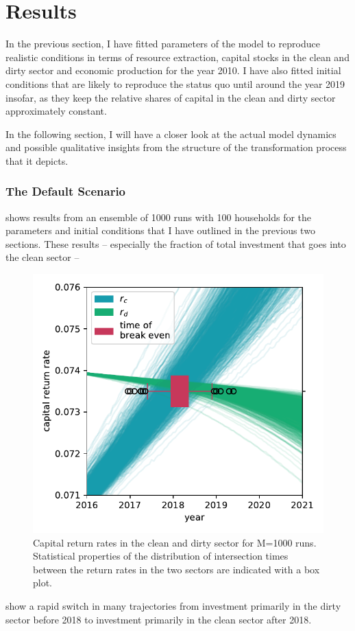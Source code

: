 \section{Results}  
In the previous section, I have fitted parameters of the model to reproduce realistic conditions in terms of resource extraction, capital stocks in the clean and dirty sector and economic production for the year 2010. I have also fitted initial conditions that are likely to reproduce the status quo until around the year 2019 insofar, as they keep the relative shares of capital in the clean and dirty sector approximately constant. 

In the following section, I will have a closer look at the actual model dynamics and possible qualitative insights from the structure of the transformation process that it depicts.

\subsubsection{The Default Scenario}
\label{sec:default_scenario}
 shows results from an ensemble of 1000 runs with 100 households for the parameters and initial conditions that I have outlined in the previous two sections. These results -- especially the fraction of total investment that goes into the clean sector -- 
\begin{figure}
	\vspace{-.1 cm}
        \hspace{-1.8 cm}
        \includegraphics[width = .64 \textwidth]{./figures/break_even.pdf}
        \caption[Capital return rates in the clean and dirty sector for N=1000 runs]{Capital return rates in the clean and dirty sector for M=1000 runs. Statistical properties of the distribution of intersection times between the return rates in the two sectors are indicated with a box plot.\label{fig:break_even}}
\end{figure}
show a rapid switch in many trajectories from investment primarily in the dirty sector before 2018 to investment primarily in the clean sector after 2018. 

